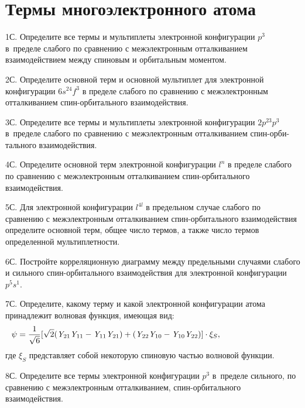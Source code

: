 \setmainfont{Noto Serif}
\setsansfont{Noto Sans}
\setmonofont{Noto Sans Mono}


\section{Термы многоэлектронного атома}

1С. Определите все термы и мультиплеты электронной конфигурации $p^3$ в~пределе слабого по сравнению с межэлектронным отталкиванием взаимодействием между спиновым и орбитальным моментом.
\par
2С. Определите основной терм и основной мультиплет для электронной конфигурации $6s^24f^3$ в пределе слабого по сравнению с межэлектронным отталкиванием спин-орбитального взаимодействия.
\par
3С. Определите все термы и мультиплеты электронной конфигурации $2p^23p^3$ в~пределе слабого по сравнению с межэлектронным отталкиванием спин-орби-тального взаимодействия.
\par
4С. Определите основной терм электронной конфигурации $l^n$ в пределе слабого по сравнению с межэлектронным отталкиванием спин-орбитального взаимодействия.
\par
5С. Для электронной конфигурации $l^{4l}$ в предельном случае слабого по сравнению с межэлектронным отталкиванием спин-орбитального взаимодействия определите основной терм, общее число термов, а также число термов определенной мультиплетности.
\par
6С. Постройте корреляционную диаграмму между предельными случаями слабого и сильного спин-орбитального взаимодействия для электронной конфигурации $p^5s^1$.
\par
7С. Определите, какому терму и какой электронной конфигурации атома принадлежит волновая функция, имеющая вид:
\begin{equation*}
\begin{aligned}
\psi &=\frac{1}{\sqrt{6}}[\sqrt{2}(\textit{Y}_{21}\textit{Y}_{11}-\textit{Y}_{11}\textit{Y}_{21})+(\textit{Y}_{22}\textit{Y}_{10}-\textit{Y}_{10}\textit{Y}_{22})]\cdot\xi_S, \hspace{28mm}
\end{aligned}
\end{equation*}
где $\xi_S$ представляет собой некоторую спиновую частью волновой функции.
\par
8С. Определите все термы электронной конфигурации $p^3$ в~пределе сильного, по сравнению с межэлектронным отталкиванием, спин-орбитального взаимодействия.
